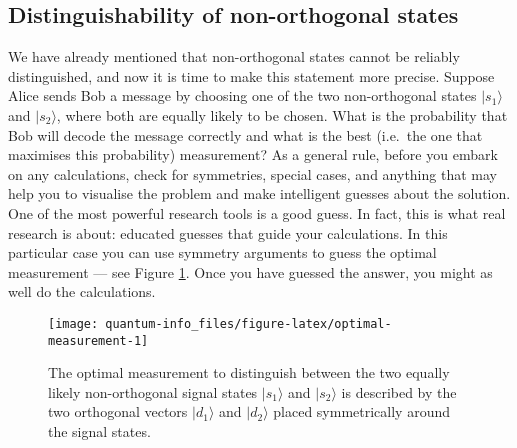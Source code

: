 \documentclass[fleqn]{article}
\begin{document}
\hypertarget{distinguishability-of-non-orthogonal-states}{%
\subsection{Distinguishability of non-orthogonal states}\label{distinguishability-of-non-orthogonal-states}}

We have already mentioned that non-orthogonal states cannot be reliably distinguished, and now it is time to make this statement more precise.
Suppose Alice sends Bob a message by choosing one of the two non-orthogonal states \(|s_1\rangle\) and \(|s_2\rangle\), where both are equally likely to be chosen.
What is the probability that Bob will decode the message correctly and what is the best (i.e.~the one that maximises this probability) measurement?
As a general rule, before you embark on any calculations, check for symmetries, special cases, and anything that may help you to visualise the problem and make intelligent guesses about the solution.
One of the most powerful research tools is a good guess.
In fact, this is what real research is about: educated guesses that guide your calculations.
In this particular case you can use symmetry arguments to guess the optimal measurement --- see Figure \ref{fig:optimal-measurement}.
Once you have guessed the answer, you might as well do the calculations.



\begin{figure}[H]

{\centering \texttt{[image: quantum-info\_files/figure-latex/optimal-measurement-1]} 

}

\caption{The optimal measurement to distinguish between the two equally likely non-orthogonal signal states \(|s_1\rangle\) and \(|s_2\rangle\) is described by the two orthogonal vectors \(|d_1\rangle\) and \(|d_2\rangle\) placed symmetrically around the signal states.}\label{fig:optimal-measurement}
\end{figure}
\end{document}
